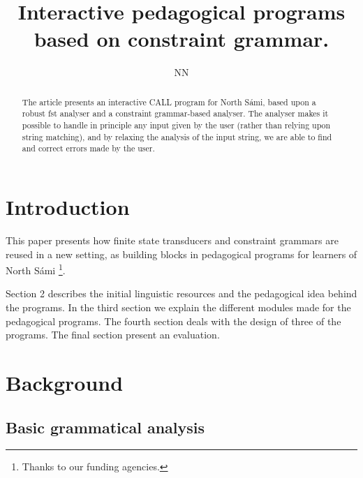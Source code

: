 \documentclass[11pt]{article}
\title{Interactive pedagogical programs based on constraint grammar.}
\author{NN}
\begin{document}


\maketitle
{}
 
\maketitle

\begin{abstract}
The article presents an interactive CALL program for North Sámi, based upon a robust fst analyser and a constraint grammar-based analyser. The analyser makes it possible to handle in principle any input given by the user (rather than relying upon string matching), and by relaxing the analysis of the input string, we are able to find and correct errors made by the user. 
\end{abstract}

\section{Introduction}
This paper presents how finite state transducers and constraint grammars are reused in a new setting, as building blocks in pedagogical programs for learners of North Sámi \footnote{Thanks to our funding agencies.}. %

Section 2 describes the initial linguistic resources and the pedagogical idea behind the programs. In the third section we explain the different modules made for the pedagogical programs. The fourth section deals with the design of three of the programs. The final section present an evaluation.


\section{Background}


\subsection{Basic grammatical analysis}
\end{document}
